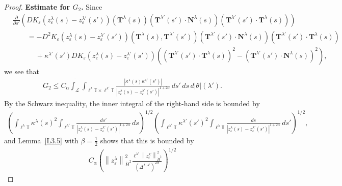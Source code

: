 \documentclass[reqno,centertags,12pt]{amsart}
\theoremstyle{definition}
\numberwithin{equation}{section}
\newcommand{\abs}[1]{\left\lvert#1\right\rvert}
\newcommand{\norm}[1]{\left\|#1\right\|}
\newcommand{\bbT}{{\mathbb{T}}}
\newcommand{\eps}{\varepsilon}
\begin{document}
\begin{proof}
    \textbf{Estimate for $G_{2}$.} Since
    \begin{align*}
        &\frac{\partial}{\partial s'}\left(
            DK_{\eps}(z_{\eps}^{\lambda}(s) - z_{\eps}^{\lambda'}(s'))(\mathbf{T}^{\lambda}(s))
            (\mathbf{T}^{\lambda'}(s') \cdot \mathbf{N}^{\lambda}(s))
            (\mathbf{T}^{\lambda'}(s') \cdot \mathbf{T}^{\lambda}(s))
        \right)
        \\&\quad\quad
        = -D^{2}K_{\eps}(z_{\eps}^{\lambda}(s) - z_{\eps}^{\lambda'}(s'))
        (\mathbf{T}^{\lambda}(s), \mathbf{T}^{\lambda'}(s'))
        (\mathbf{T}^{\lambda'}(s') \cdot \mathbf{N}^{\lambda}(s))
        (\mathbf{T}^{\lambda'}(s') \cdot \mathbf{T}^{\lambda}(s))
        \\&\quad\quad\quad\ 
        + \kappa^{\lambda'}(s')DK_{\eps}(z_{\eps}^{\lambda}(s) - z_{\eps}^{\lambda'}(s'))
        \left(
            (\mathbf{T}^{\lambda'}(s') \cdot \mathbf{T}^{\lambda}(s))^{2}
            - (\mathbf{T}^{\lambda'}(s') \cdot \mathbf{N}^{\lambda}(s))^{2}
        \right),
    \end{align*}
    we see that
    \begin{align*}
       G_{2} \leq C_{\alpha}\overline{\int_{\mathcal{L}}}
        \int_{\ell^{\lambda}\bbT\times\ell^{\lambda'}\bbT}
        \frac{\abs{\kappa^{\lambda}(s)\kappa^{\lambda'}(s')}}
        {\abs{z_{\eps}^{\lambda}(s) - z_{\eps}^{\lambda'}(s')}^{1+2\alpha}}
        \,ds'\,ds\,d|\theta|(\lambda').
    \end{align*}
    By the Schwarz inequality, the inner integral
    of the right-hand side is bounded by
    \begin{align*}
        \left(
            \int_{\ell^{\lambda}\bbT}\kappa^{\lambda}(s)^{2}
            \int_{\ell^{\lambda'}\bbT}\frac{ds'}
            {\abs{z_{\eps}^{\lambda}(s) - z_{\eps}^{\lambda'}(s')}^{1+2\alpha}}
            \,ds
        \right)^{1/2}
        \left(
            \int_{\ell^{\lambda'}\bbT}\kappa^{\lambda'}(s')^{2}
            \int_{\ell^{\lambda}\bbT}\frac{ds}
            {\abs{z_{\eps}^{\lambda}(s) - z_{\eps}^{\lambda'}(s')}^{1+2\alpha}}
            \,ds'
        \right)^{1/2},
    \end{align*}
    and Lemma~\ref{L3.5} with $\beta=\frac 12$ shows that this is bounded by
    \begin{align*}
        C_{\alpha}\left(
            \norm{z_{\eps}^{\lambda}}_{\dot{H}^{2}}^{2}
            \frac{\ell^{\lambda'}\norm{z_{\eps}^{\lambda'}}_{\dot{H}^{2}}^{2}}
            {(\Delta^{\lambda,\lambda'})^{2\alpha}}
        \right)^{1/2}

\end{align*}
\end{proof}
\end{document}
